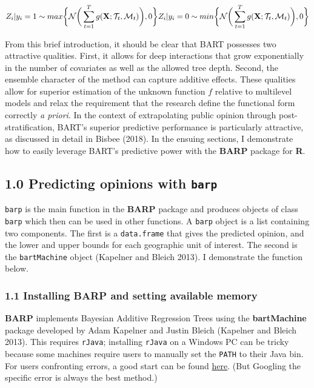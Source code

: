 \documentclass[]{article}
\begin{document}
\[Z_i|y_i = 1 \sim max\bigg\{\mathcal{N}\bigg(\sum_{t = 1}^Tg(\mathbf{X};\mathcal{T}_t,\mathcal{M}_t)\bigg),0\bigg\} \\
Z_i|y_i = 0 \sim min\bigg\{\mathcal{N}\bigg(\sum_{t = 1}^Tg(\mathbf{X};\mathcal{T}_t,\mathcal{M}_t)\bigg),0\bigg\}\]

From this brief introduction, it should be clear that BART possesses two
attractive qualities. First, it allows for deep interactions that grow
exponentially in the number of covariates as well as the allowed tree
depth. Second, the ensemble character of the method can capture additive
effects. These qualities allow for superior estimation of the unknown
function \(f\) relative to multilevel models and relax the requirement
that the research define the functional form correctly \emph{a priori}.
In the context of extrapolating public opinion through
post-stratification, BART's superior predictive performance is
particularly attractive, as discussed in detail in Bisbee (2018). In the
ensuing sections, I demonstrate how to easily leverage BART's predictive
power with the \textbf{BARP} package for \textbf{R}.

\subsection{\texorpdfstring{1.0 Predicting opinions with
\texttt{barp}}{1.0 Predicting opinions with barp}}\label{predicting-opinions-with-barp}

\texttt{barp} is the main function in the \textbf{BARP} package and
produces objects of class \texttt{barp} which then can be used in other
functions. A \texttt{barp} object is a list containing two components.
The first is a \texttt{data.frame} that gives the predicted opinion, and
the lower and upper bounds for each geographic unit of interest. The
second is the \texttt{bartMachine} object (Kapelner and Bleich 2013). I
demonstrate the function below.

\subsubsection{\texorpdfstring{1.1 Installing \textbf{BARP} and setting
available
memory}{1.1 Installing BARP and setting available memory}}\label{installing-barp-and-setting-available-memory}

\textbf{BARP} implements Bayesian Additive Regression Trees using the
\textbf{bartMachine} package developed by Adam Kapelner and Justin
Bleich (Kapelner and Bleich 2013). This requires \texttt{rJava};
installing \texttt{rJava} on a Windows PC can be tricky because some
machines require users to manually set the \texttt{PATH} to their Java
bin. For users confronting errors, a good start can be found
\href{https://www.r-statistics.com/2012/08/how-to-load-the-rjava-package-after-the-error-java_home-cannot-be-determined-from-the-registry/}{here}.
(But Googling the specific error is always the best method.)
\end{document}
